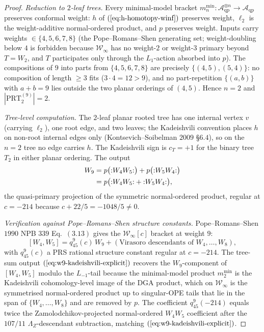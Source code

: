 \begin{proof}
\emph{Reduction to $2$-leaf trees.} Every minimal-model bracket
$m_n^{\mathrm{min}}\colon\mathcal A_{\mathrm{qp}}^{\otimes n}\to
\mathcal A_{\mathrm{qp}}$ preserves conformal weight: $h$ of
$(\ref{eq:h-homotopy-winf})$ preserves weight, $\ell_2$ is the
weight-additive normal-ordered product, and $p$ preserves weight.
Inputs carry weights $\in\{4,5,6,7,8\}$ (the Pope--Romans--Shen
generating set; weight-doubling below $4$ is forbidden because
$\mathcal W_\infty$ has no weight-$2$ or weight-$3$ primary beyond
$T=W_2$, and $T$ participates only through the $L_1$-action absorbed
into $p$). The compositions of $9$ into parts from $\{4,5,6,7,8\}$
are precisely $\{(4,5),(5,4)\}$: no composition of length $\ge 3$
fits ($3\cdot 4=12>9$), and no part-repetition $\{(a,b)\}$ with
$a+b=9$ lies outside the two planar orderings of $(4,5)$. Hence
$n=2$ and $|\mathrm{PRT}_2^{(9)}|=2$.

\emph{Tree-level computation.} The $2$-leaf planar rooted tree has
one internal vertex $v$ (carrying $\ell_2$), one root edge, and two
leaves; the Kadeishvili convention places $h$ on non-root internal
edges only (Kontsevich--Soibelman $2009$ \S$6$.$4$), so on the
$n=2$ tree no edge carries $h$. The Kadeishvili sign is $c_T=+1$
for the binary tree $T_2$ in either planar ordering. The output
\begin{align}
\label{eq:w9-kadeishvili-explicit}
W_9 &= p\bigl({:}W_4W_5{:}\bigr)+p\bigl({:}W_5W_4{:}\bigr)
\\
&= p\bigl({:}W_4W_5{:}+{:}W_5W_4{:}\bigr),
\notag
\end{align}
the quasi-primary projection of the symmetric normal-ordered
product, regular at $c=-214$ because $c+22/5=-1048/5\ne 0$.

\emph{Verification against Pope--Romans--Shen structure constants.}
Pope--Romans--Shen $1990$ NPB $339$ Eq.~$(3.13)$ gives the $\mathcal
W_\infty[c]$ bracket at weight $9$:
\begin{equation}
\label{eq:prs-w45-bracket}
[W_4,W_5] = q_{45}^{9}(c)\,W_9
+ (\text{Virasoro descendants of $W_4,\ldots,W_8$}),
\end{equation}
with $q_{45}^{9}(c)$ a PRS rational structure constant regular at
$c=-214$. The tree-sum output
$(\ref{eq:w9-kadeishvili-explicit})$ recovers the $W_9$-component of
$[W_4,W_5]$ modulo the $L_{-1}$-tail because the minimal-model
product $m_2^{\mathrm{min}}$ is the Kadeishvili cohomology-level
image of the DGA product, which on $\mathcal W_\infty$ is the
symmetrised normal-ordered product up to singular-OPE tails that
lie in the span of $\{W_4,\ldots,W_8\}$ and are removed by $p$. The
coefficient $q_{45}^{9}(-214)$ equals twice the Zamolodchikov-projected
normal-ordered $W_4W_5$ coefficient after the $107/11$
$\Lambda_Z$-descendant subtraction, matching
$(\ref{eq:w9-kadeishvili-explicit})$.


\end{proof}
